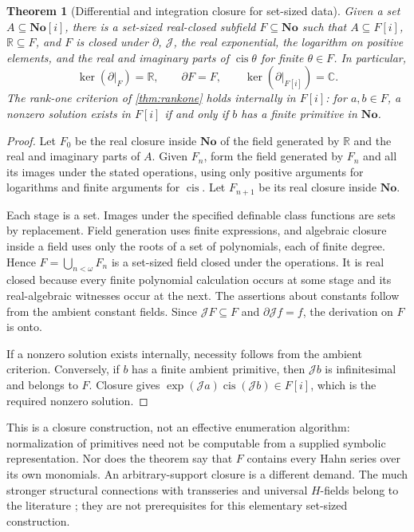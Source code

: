 \documentclass[11pt,letterpaper]{article}
\numberwithin{equation}{section}
\newtheorem{theorem}{Theorem}[section]
\theoremstyle{definition}
\theoremstyle{remark}
\newcommand{\No}{\mathbf{No}}
\newcommand{\SC}{\mathbf{No}[i]}
\newcommand{\R}{\mathbb R}
\newcommand{\C}{\mathbb C}
\newcommand{\D}{\partial}
\newcommand{\J}{\mathcal J}
\newcommand{\cis}{\operatorname{cis}}
\begin{document}
\begin{theorem}[Differential and integration closure for set-sized data]
\label{thm:workspace}
Given a set $A\subseteq\SC$, there is a set-sized real-closed subfield
$F\subseteq\No$ such that $A\subseteq F[i]$, $\R\subseteq F$, and $F$ is
closed under $\D$, $\J$, the real exponential, the logarithm on positive
elements, and the real and imaginary parts of $\cis\theta$ for finite
$\theta\in F$. In particular,
\[
 \ker(\D|_F)=\R,\qquad \D F=F,
 \qquad \ker(\D|_{F[i]})=\C.
\]
The rank-one criterion of \cref{thm:rankone} holds internally in $F[i]$:
for $a,b\in F$, a nonzero solution exists in $F[i]$ if and only if $b$
has a finite primitive in $\No$.
\end{theorem}
\begin{proof}
Let $F_0$ be the real closure inside $\No$ of the field generated by
$\R$ and the real and imaginary parts of $A$. Given $F_n$, form the field
generated by $F_n$ and all its images under the stated operations, using
only positive arguments for logarithms and finite arguments for $\cis$.
Let $F_{n+1}$ be its real closure inside $\No$.

Each stage is a set. Images under the specified definable class functions
are sets by replacement. Field generation uses finite expressions, and
algebraic closure inside a field uses only the roots of a set of
polynomials, each of finite degree. Hence
$F=\bigcup_{n<\omega}F_n$ is a set-sized field closed under the operations.
It is real closed because every finite polynomial calculation occurs at
some stage and its real-algebraic witnesses occur at the next. The assertions
about constants follow from the ambient constant fields. Since $\J F\subseteq F$
and $\D\J f=f$, the derivation on $F$ is onto.

If a nonzero solution exists internally, necessity follows from the ambient
criterion. Conversely, if $b$ has a finite ambient primitive, then $\J b$
is infinitesimal and belongs to $F$. Closure gives
$\exp(\J a)\cis(\J b)\in F[i]$, which is the required nonzero solution.
\end{proof}

This is a closure construction, not an effective enumeration algorithm:
normalization of primitives need not be computable from a supplied symbolic
representation. Nor does the theorem say that $F$ contains every Hahn series
over its own monomials. An arbitrary-support closure is a different demand.
The much stronger structural connections with transseries and universal
$H$-fields belong to the literature \cite{ADH}; they are not prerequisites
for this elementary set-sized construction.
\end{document}
